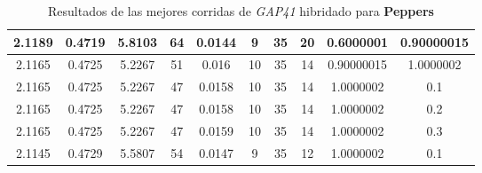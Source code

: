 \begin{table}[h!]
\begin{center}
\begin{tabular}{|c|c|c|c|c|c|c|c|c|c|}
        \hline
            2.1189 & 0.4719  & 5.8103 & 64 & 0.0144 & 9 & 35 & 20 & 0.6000001 & 0.90000015\\
        \hline
        \hline
            2.1165 & 0.4725  & 5.2267 & 51 & 0.016 & 10 & 35 & 14 & 0.90000015 & 1.0000002\\
        \hline
        \hline
            2.1165 & 0.4725  & 5.2267 & 47 & 0.0158 & 10 & 35 & 14 & 1.0000002 & 0.1\\
        \hline
        \hline
            2.1165 & 0.4725  & 5.2267 & 47 & 0.0158 & 10 & 35 & 14 & 1.0000002 & 0.2\\
        \hline
        \hline
            2.1165 & 0.4725  & 5.2267 & 47 & 0.0159 & 10 & 35 & 14 & 1.0000002 & 0.3\\
        \hline
        \hline
            2.1145 & 0.4729  & 5.5807 & 54 & 0.0147 & 9 & 35 & 12 & 1.0000002 & 0.1\\
        \hline
        \end{tabular}
        \caption{Resultados de las mejores corridas de \emph{GAP41} hibridado para {\bf Peppers}}
        \label{tb:tableGAP41}
    \end{center}
\end{table}
